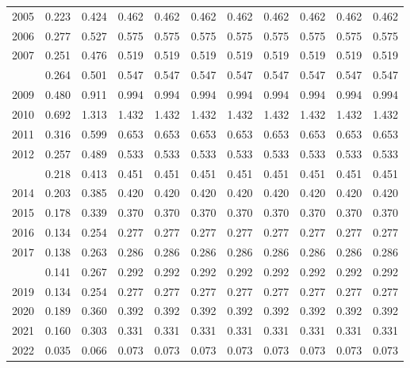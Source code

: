 \documentclass[
]{article}
\begin{document}
\begin{longtable}[t]{lrrrrrrrrrr}
2005 & 0.223 & 0.424 & 0.462 & 0.462 & 0.462 & 0.462 & 0.462 & 0.462 & 0.462 & 0.462\\
2006 & 0.277 & 0.527 & 0.575 & 0.575 & 0.575 & 0.575 & 0.575 & 0.575 & 0.575 & 0.575\\
2007 & 0.251 & 0.476 & 0.519 & 0.519 & 0.519 & 0.519 & 0.519 & 0.519 & 0.519 & 0.519\\
\addlinespace
2008 & 0.264 & 0.501 & 0.547 & 0.547 & 0.547 & 0.547 & 0.547 & 0.547 & 0.547 & 0.547\\
2009 & 0.480 & 0.911 & 0.994 & 0.994 & 0.994 & 0.994 & 0.994 & 0.994 & 0.994 & 0.994\\
2010 & 0.692 & 1.313 & 1.432 & 1.432 & 1.432 & 1.432 & 1.432 & 1.432 & 1.432 & 1.432\\
2011 & 0.316 & 0.599 & 0.653 & 0.653 & 0.653 & 0.653 & 0.653 & 0.653 & 0.653 & 0.653\\
2012 & 0.257 & 0.489 & 0.533 & 0.533 & 0.533 & 0.533 & 0.533 & 0.533 & 0.533 & 0.533\\
\addlinespace
2013 & 0.218 & 0.413 & 0.451 & 0.451 & 0.451 & 0.451 & 0.451 & 0.451 & 0.451 & 0.451\\
2014 & 0.203 & 0.385 & 0.420 & 0.420 & 0.420 & 0.420 & 0.420 & 0.420 & 0.420 & 0.420\\
2015 & 0.178 & 0.339 & 0.370 & 0.370 & 0.370 & 0.370 & 0.370 & 0.370 & 0.370 & 0.370\\
2016 & 0.134 & 0.254 & 0.277 & 0.277 & 0.277 & 0.277 & 0.277 & 0.277 & 0.277 & 0.277\\
2017 & 0.138 & 0.263 & 0.286 & 0.286 & 0.286 & 0.286 & 0.286 & 0.286 & 0.286 & 0.286\\
\addlinespace
2018 & 0.141 & 0.267 & 0.292 & 0.292 & 0.292 & 0.292 & 0.292 & 0.292 & 0.292 & 0.292\\
2019 & 0.134 & 0.254 & 0.277 & 0.277 & 0.277 & 0.277 & 0.277 & 0.277 & 0.277 & 0.277\\
2020 & 0.189 & 0.360 & 0.392 & 0.392 & 0.392 & 0.392 & 0.392 & 0.392 & 0.392 & 0.392\\
2021 & 0.160 & 0.303 & 0.331 & 0.331 & 0.331 & 0.331 & 0.331 & 0.331 & 0.331 & 0.331\\
2022 & 0.035 & 0.066 & 0.073 & 0.073 & 0.073 & 0.073 & 0.073 & 0.073 & 0.073 & 0.073\\*
\end{longtable}
\end{document}
